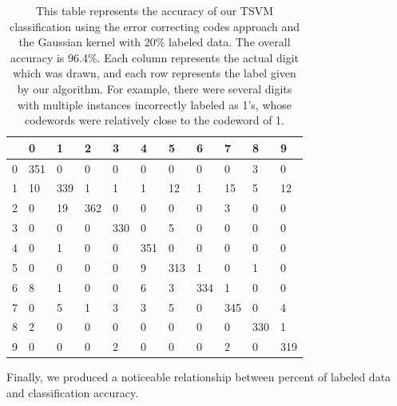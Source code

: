 \documentclass[11pt]{article}
\begin{document}
\begin{table}[]
  \centering
  \caption{This table represents the accuracy of our TSVM classification using
  the error correcting codes approach and the Gaussian kernel
 with 20\% labeled data. The overall accuracy is 96.4\%. Each column represents the actual digit which was drawn, and each row represents the label given by our algorithm. For example, there were several digits with multiple instances
  incorrectly labeled as 1's, whose codewords were relatively close to the
  codeword of 1.}
  \label{my-table}
  \vspace{.3in}
  \begin{tabular}{l|llllllllll}
    & 0 & 1 & 2 & 3 & 4 & 5 & 6 & 7 & 8 & 9\\\hline
    0 &351 & 0   & 0   & 0   & 0   & 0   & 0   & 0   & 3   & 0   \\
    1 &10   & 339 & 1  & 1   & 1   & 12   & 1   & 15  & 5   & 12  \\
    2 & 0   & 19  & 362 & 0   & 0   & 0   & 0   & 3   & 0   & 0   \\
    3 & 0   & 0   & 0   & 330 & 0   & 5  & 0   & 0   & 0   & 0   \\
    4 & 0   & 1   & 0   & 0   & 351 & 0   & 0   & 0  & 0   & 0   \\
    5 & 0   & 0  & 0   & 0   & 9  & 313 & 1   & 0   & 1  & 0  \\
    6 & 8   & 1   & 0   & 0   & 6   & 3   & 334 & 1   & 0   & 0   \\
    7 & 0   & 5   & 1   & 3   & 3   & 5   & 0   & 345 & 0   & 4   \\
    8 & 2  & 0   & 0   & 0   & 0   & 0   & 0   & 0   & 330 & 1   \\
    9 & 0   & 0   & 0   & 2   & 0  & 0  & 0   & 2   & 0   & 319
  \end{tabular}
  \end{table}

Finally, we produced a noticeable relationship between percent of labeled data and classification accuracy. \par
\end{document}
